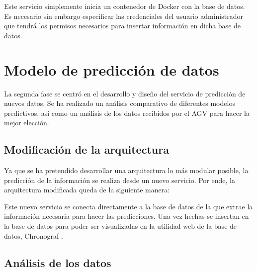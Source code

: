 Este servicio simplemente inicia un contenedor de Docker con la base de datos. Es necesario sin embargo 
especificar las credenciales del usuario administrador que tendrá los permisos necesarios para insertar 
información en dicha base de datos.

\section{Modelo de predicción de datos}

La segunda fase se centró en el desarrollo y diseño del servicio de predicción de nuevos datos.
Se ha realizado un análisis comparativo de diferentes modelos predictivos, así como un análisis
de los datos recibidos por el AGV para hacer la mejor elección.

\subsection{Modificación de la arquitectura}

Ya que se ha pretendido desarrollar una arquitectura lo más modular posible, la predicción de la 
información se realiza desde un nuevo servicio. Por ende, la arquitectura modificada queda de la 
siguiente manera:


Este nuevo servicio se conecta directamente a la base de datos de la que extrae la 
información necesaria para hacer las predicciones. Una vez hechas se insertan en la base de datos 
para poder ser visualizadas en la utilidad web de la base de datos, Chronograf \cite{chronograf:docs}.

\subsection{Análisis de los datos}

